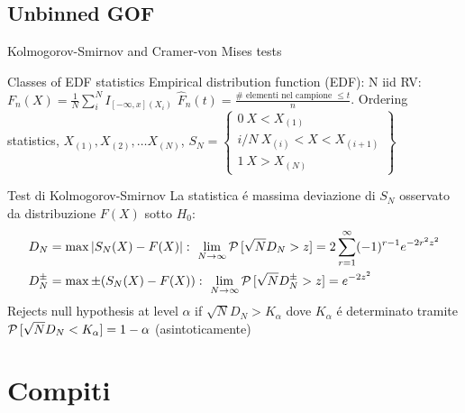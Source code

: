 \subsection{Unbinned GOF}

\begin{frame}{Kolmogorov-Smirnov and Cramer-von Mises tests}
\begin{block}{Classes of EDF statistics}
	Empirical distribution function (EDF): N iid RV: $F_n(X)=\frac{1}{N}\sum_i^NI_{[-\infty,x](X_i)}$ $\hat{F}_n(t)=\frac{\#\text{ elementi nel campione }\leq t}{n}$.
 Ordering statistics, $X_{(1)}, X_{(2)}, \ldots X_{(N)}$, $S_N=\left\{\begin{array}{c}0\ X<X_{(1)}\\i/N\ X_{(i)}<X<X_{(i+1)}\\1\ X>X_{(N)}\end{array}\right\}$
\end{block}

\begin{block}{Test di Kolmogorov-Smirnov }
La statistica \'e massima deviazione di $S_N$ osservato da distribuzione $F(X)$ sotto $H_0$:
\begin{align*}
&D_N=\max|S_N(X)-F(X)|:\ \lim_{N\to\infty}\prob{[\sqrt{N}D_N>z]}=2\sum_{r=1}^{\infty}(-1)\expy{r-1}\exp{-2r^2z^2}\\
&D_N^{\pm}=\max\pm(S_N(X)-F(X)):\ \lim_{N\to\infty}\prob{[\sqrt{N}D_N^{\pm}>z]}=\exp{-2z^2}
\end{align*}
Rejects null hypothesis at level $\alpha$ if $\sqrt{N}D_N>K_{\alpha}$ dove $K_{\alpha}$ \'e determinato tramite $\operatorname{\mathcal{P}}{[\sqrt{N}D_N<K_{\alpha}]}=1-\alpha$ (asintoticamente)
\end{block}
\end{frame}


\section{Compiti}

